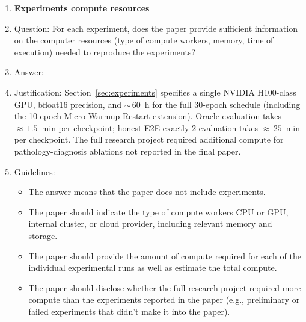 \begin{enumerate}
\item {\bf Experiments compute resources}
    \item[] Question: For each experiment, does the paper provide sufficient information on the computer resources (type of compute workers, memory, time of execution) needed to reproduce the experiments?
    \item[] Answer: \answerYes{}
    \item[] Justification: Section~\ref{sec:experiments} specifies a single NVIDIA H100-class GPU, bfloat16 precision, and ${\sim}\,60$~h for the full 30-epoch schedule (including the 10-epoch Micro-Warmup Restart extension). Oracle evaluation takes $\approx\,1.5$~min per checkpoint; honest E2E exactly-2 evaluation takes $\approx\,25$~min per checkpoint. The full research project required additional compute for pathology-diagnosis ablations not reported in the final paper.
    \item[] Guidelines:
    \begin{itemize}
        \item The answer \answerNA{} means that the paper does not include experiments.
        \item The paper should indicate the type of compute workers CPU or GPU, internal cluster, or cloud provider, including relevant memory and storage.
        \item The paper should provide the amount of compute required for each of the individual experimental runs as well as estimate the total compute.
        \item The paper should disclose whether the full research project required more compute than the experiments reported in the paper (e.g., preliminary or failed experiments that didn't make it into the paper).
    \end{itemize}


\end{enumerate}
